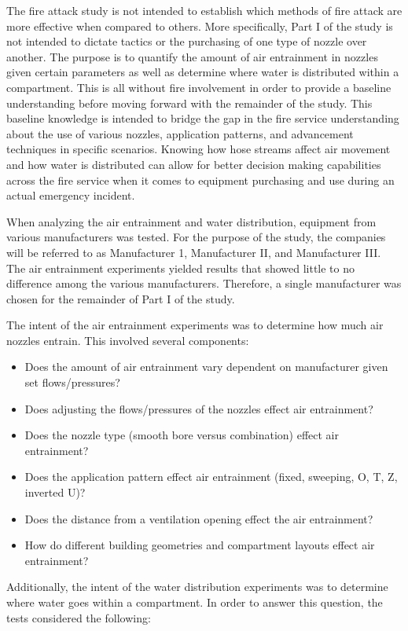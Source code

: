 \documentclass{article}
\begin{document}
The fire attack study is not intended to establish which methods of fire attack are more effective when compared to others. More specifically, Part I of the study is not intended to dictate tactics or the purchasing of one type of nozzle over another. The purpose is to quantify the amount of air entrainment in nozzles given certain parameters as well as determine where water is distributed within a compartment. This is all without fire involvement in order to provide a baseline understanding before moving forward with the remainder of the study. This baseline knowledge is intended to bridge the gap in the fire service understanding about the use of various nozzles, application patterns, and advancement techniques in specific scenarios. Knowing how hose streams affect air movement and how water is distributed can allow for better decision making capabilities across the fire service when it comes to equipment purchasing and use during an actual emergency incident.

When analyzing the air entrainment and water distribution, equipment from various manufacturers was tested. For the purpose of the study, the companies will be referred to as Manufacturer 1, Manufacturer II, and Manufacturer III. The air entrainment experiments yielded results that showed little to no difference among the various manufacturers. Therefore, a single manufacturer was chosen for the remainder of Part I of the study.

The intent of the air entrainment experiments was to determine how much air nozzles entrain. This involved several components:

\begin{itemize}
	\item Does the amount of air entrainment vary dependent on manufacturer given set flows/pressures?
	\item Does adjusting the flows/pressures of the nozzles effect air entrainment? 
	\item Does the nozzle type (smooth bore versus combination) effect air entrainment? 
	\item Does the application pattern effect air entrainment (fixed, sweeping, O, T, Z, inverted U)?
	\item Does the distance from a ventilation opening effect the air entrainment?
	\item How do different building geometries and compartment layouts effect air entrainment?
\end{itemize}

Additionally, the intent of the water distribution experiments was to determine where water goes within a compartment. In order to answer this question, the tests considered the following:
\end{document}
